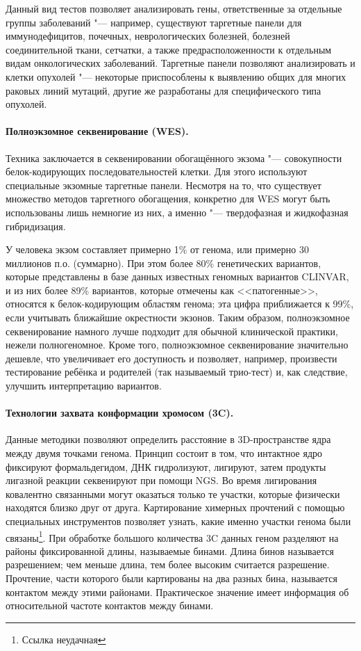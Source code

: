 \documentclass[a4paper,12pt]{article}
\begin{document}
Данный вид тестов позволяет анализировать гены, ответственные за отдельные группы заболеваний "--- например, существуют таргетные панели для иммунодефицитов, почечных, неврологических болезней, болезней соединительной ткани, сетчатки, а также предрасположенности к отдельным видам онкологических заболеваний.
Таргетные панели позволяют анализировать и клетки опухолей "--- некоторые приспособлены к выявлению общих для многих раковых линий мутаций, другие же разработаны для специфического типа опухолей\cite{yohe}.

\paragraph{Полноэкзомное секвенирование (WES).}
Техника заключается в секвенировании обогащённого экзома "--- совокупности белок-кодирующих последовательностей клетки.
Для этого используют специальные экзомные таргетные панели.
Несмотря на то, что существует множество методов таргетного обогащения, конкретно для WES могут быть использованы лишь немногие из них, а именно "--- твердофазная и жидкофазная гибридизация\cite{teer}.

У человека экзом составляет примерно 1\% от генома, или примерно 30 миллионов п.о. (суммарно).
При этом более 80\% генетических вариантов, которые представлены в базе данных известных геномных вариантов CLINVAR, и из них более 89\% вариантов, которые отмечены как <<патогенные>>, относятся к белок-кодирующим областям генома;
эта цифра приближается к 99\%, если учитывать ближайшие окрестности экзонов\cite{barbitoff}.
Таким образом, полноэкзомное секвенирование намного лучше подходит для обычной клинической практики, нежели полногеномное.
Кроме того, полноэкзомное секвенирование значительно дешевле, что увеличивает его доступность и позволяет, например, произвести тестирование ребёнка и родителей (так называемый трио-тест) и, как следствие, улучшить интерпретацию вариантов\cite{yohe}.

\paragraph{Технологии захвата конформации хромосом (3C).}
Данные методики позволяют определить расстояние в 3D-пространстве ядра между двумя точками генома.
Принцип состоит в том, что интактное ядро фиксируют формальдегидом, ДНК гидролизуют, лигируют, затем продукты лигазной реакции секвенируют при помощи NGS.
Во время лигирования ковалентно связанными могут оказаться только те участки, которые физически находятся близко друг от друга.
Картирование химерных прочтений с помощью специальных инструментов позволяет узнать, какие именно участки генома были связаны\cite{dekker}\footnote{Ссылка неудачная}.
При обработке большого количества 3C данных геном разделяют на районы фиксированной длины, называемые бинами.
Длина бинов называется разрешением; чем меньше длина, тем более высоким считается разрешение.
Прочтение, части которого были картированы на два разных бина, называется контактом между этими районами.
Практическое значение имеет информация об относительной частоте контактов между бинами.
\end{document}
